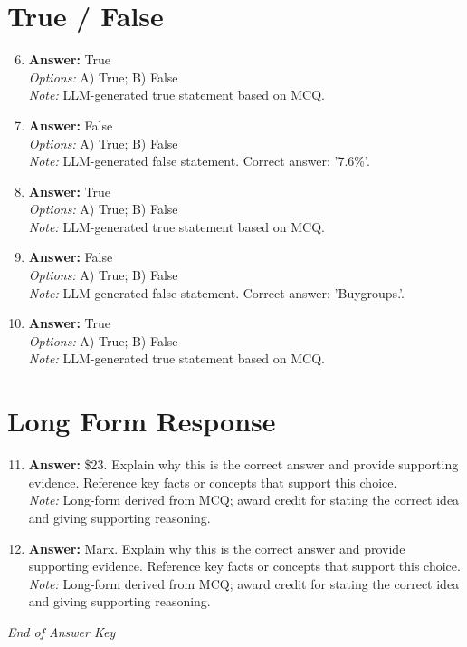 \documentclass[12pt]{article}
\begin{document}
\section*{True / False}
\begin{enumerate}[label=\arabic*.]
\setcounter{enumi}{5}
\item \textbf{Answer:} True
\\ \textit{Options:} A) True; B) False
\\ \textit{Note:} LLM-generated true statement based on MCQ.
\item \textbf{Answer:} False
\\ \textit{Options:} A) True; B) False
\\ \textit{Note:} LLM-generated false statement. Correct answer: '7.6\%'.
\item \textbf{Answer:} True
\\ \textit{Options:} A) True; B) False
\\ \textit{Note:} LLM-generated true statement based on MCQ.
\item \textbf{Answer:} False
\\ \textit{Options:} A) True; B) False
\\ \textit{Note:} LLM-generated false statement. Correct answer: 'Buygroups.'.
\item \textbf{Answer:} True
\\ \textit{Options:} A) True; B) False
\\ \textit{Note:} LLM-generated true statement based on MCQ.
\end{enumerate}

\section*{Long Form Response}
\begin{enumerate}[label=\arabic*.]
\setcounter{enumi}{10}
\item \textbf{Answer:} \$23. Explain why this is the correct answer and provide supporting evidence. Reference key facts or concepts that support this choice.
\\ \textit{Note:} Long-form derived from MCQ; award credit for stating the correct idea and giving supporting reasoning.
\item \textbf{Answer:} Marx. Explain why this is the correct answer and provide supporting evidence. Reference key facts or concepts that support this choice.
\\ \textit{Note:} Long-form derived from MCQ; award credit for stating the correct idea and giving supporting reasoning.
\end{enumerate}

\vfill
\noindent\textit{End of Answer Key}
\end{document}
